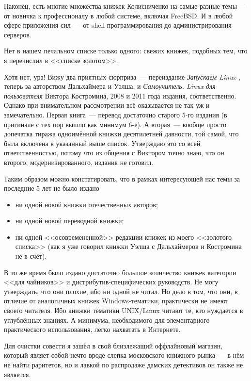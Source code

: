 Наконец, есть многие множества книжек Колисниченко на самые разные темы~--- от новичка к профессионалу в любой системе, включая FreeBSD. И в любой сфере приложения сил~--- от shell-программирования до администрирования серверов.

Нет в нашем печальном списке только одного: свежих книжек, подобных тем, что я перечислил в <<списке золотом>>.

Хотя нет, ура! Вижу два приятных сюрприза~--- переиздание 
\textit{Запускаем Linux}
, теперь за авторством Дальхаймера и Уэлша, и 
\textit{Самоучитель. Linux для пользователя}
 Виктора Костромина, 2008 и 2011 года издания, соответственно. Однако при внимательном рассмотрении всё оказывается не так уж и замечательно. Первая книга~--- перевод достаточно старого 5-го издания (в оригинале с тех пор вышло как минимум 6-е). А вторая~--- вообще просто допечатка тиража одноимённой книжки десятилетней давности, той самой, что была включена в указанный выше список. Утверждаю это со всей ответственностью, потому что из общения с Виктором точно знаю, что он второго, модернизированного, издания не готовил.

Таким образом можно констатировать, что в рамках интересующей нас темы за последние 5 лет не было издано

\begin{itemize}
	\item ни одной новой книжки отечественных авторов; 
	\item ни одной новой переводной книжки; 
	\item ни одной <<осовремененной>> редакции книжек из моего <<золотого списка>> (как я уже говорил книжки Уэлша с Дальхаймеров и Костромина не в счёт). 
\end{itemize}



В то же время было издано достаточно большое количество книжек категории <<для чайников>> и дистрибутив-специфических руководств. Не могу утверждать, что они плохие, ибо ни одной не читал. Но дело в том, что они, в отличие от аналогичных книжек Windows-тематики, практически не имеют своего читателя. Ибо книжки тематики UNIX/Linux читают те, кто нуждается в углублённых знаниях. А минимума, необходимого для элементарного практического использования, легко нахватать в Интернете.

Для очистки совести я зашёл в свой близлежащий оффлайновый магазин, который являет собой нечто вроде слепка московского книжного рынка~--- в нём не найти раритетов, но и лавкой по распродаже дамских детективов он также не является.

